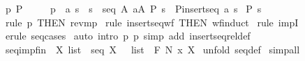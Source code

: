 \begin{isabellebody}
\ p{}{\isacharcolon}\ {\isachardoublequoteopen}P\ {\isacharpercent}{\isacharless}{\isacharpercent}{\isachargreater}{\isachardoublequoteclose}\ \ \ \isanewline
{}\ p{}{\isacharcolon}\ {\isachardoublequoteopen}{\isacharbang}{\isacharbang}\ a\ s{\isachardot}\ {\isacharbrackleft}{\isacharbar}\ s\ {\isacharcolon}\ seq\ A{\isacharsemicolon}\ a{\isacharcolon}A{\isacharsemicolon}\ P\ s{\isacharbar}{\isacharbrackright}\ {\isacharequal}{\isacharequal}{\isachargreater}\ P{\isacharparenleft}insertseq\ a\ s{\isacharparenright}{\isachardoublequoteclose}\isanewline
{}\ {\isachardoublequoteopen}P\ s{\isachardoublequoteclose}\isanewline
%
\isadelimproof
%
\endisadelimproof
%
\isatagproof
{}\isamarkupfalse%
\ {\isacharparenleft}rule\ p{}\ {\isacharbrackleft}THEN\ rev{\isacharunderscore}mp{\isacharbrackright}{\isacharparenright}\isanewline
{}\isamarkupfalse%
\ {\isacharparenleft}rule\ insertseq{\isacharunderscore}wf\ {\isacharbrackleft}THEN\ wf{\isacharunderscore}induct{\isacharbrackright}{\isacharparenright}\isanewline
{}\isamarkupfalse%
\ {\isacharparenleft}rule\ impI{\isacharparenright}\isanewline
{}\isamarkupfalse%
\ {\isacharparenleft}erule\ seq{\isacharunderscore}cases{\isacharparenright}\isanewline
{}\isamarkupfalse%
\ {\isacharparenleft}auto\ intro{\isacharbang}{\isacharcolon}\ p{}\ p{}\ simp\ add{\isacharcolon}\ insertseq{\isacharunderscore}rel{\isacharunderscore}def{\isacharparenright}\isanewline
{}\isamarkupfalse%
%
\endisatagproof
{\isafoldproof}%
%
\isadelimproof
\isanewline
%
\endisadelimproof
\isanewline
\isanewline
\isanewline
{}\isamarkupfalse%
\ seq{\isacharunderscore}imp{\isacharunderscore}fin{\isacharcolon}\ {\isachardoublequoteopen}{\isacharbang}{\isacharbang}\ X{\isachardot}\ list\ {\isacharcolon}\ seq\ X\ \ {\isacharequal}{\isacharequal}{\isachargreater}\ list\ {\isacharcolon}\ {\isacharpercent}F\ {\isacharparenleft}{\isacharpercent}N\ {\isacharpercent}x\ X{\isacharparenright}{\isachardoublequoteclose}\isanewline
%
\isadelimproof
%
\endisadelimproof
%
\isatagproof
{}\isamarkupfalse%
\ {\isacharparenleft}unfold\ seq{\isacharunderscore}def{\isacharparenright}\isanewline
{}\isamarkupfalse%
\ simp{\isacharunderscore}all\isanewline
{}\isamarkupfalse%
%
\endisatagproof
{\isafoldproof}%
%
\isadelimproof
\isanewline
%
\endisadelimproof
\isanewline
\isanewline
\isanewline
{}\isamarkupfalse%

\end{isabellebody}

